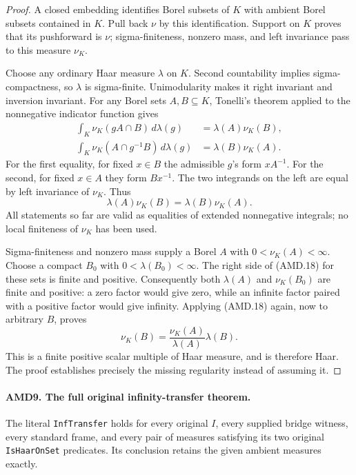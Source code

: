 \begin{proof}
A closed embedding identifies Borel subsets of \(K\) with
ambient Borel subsets contained in \(K\).  Pull back \(\nu\)
by this identification.  Support on \(K\) proves that its
pushforward is \(\nu\); sigma-finiteness, nonzero mass, and
left invariance pass to this measure \(\nu_K\).

Choose any ordinary Haar measure \(\lambda\) on \(K\).
Second countability implies sigma-compactness, so \(\lambda\)
is sigma-finite.  Unimodularity makes it right invariant and
inversion invariant.  For any Borel sets \(A,B\subseteq K\),
Tonelli's theorem applied to the nonnegative indicator function
gives
\[
\begin{split}
 \int_K\nu_K(gA\cap B)\,d\lambda(g)
        &=\lambda(A)\nu_K(B),\\
 \int_K\nu_K(A\cap g^{-1}B)\,d\lambda(g)
        &=\lambda(B)\nu_K(A).
\end{split}
 \tag{AMD.17}
\]
For the first equality, for fixed \(x\in B\) the admissible
\(g\)'s form \(xA^{-1}\).  For the second, for fixed
\(x\in A\) they form \(Bx^{-1}\).  The two integrands on
the left are equal by left invariance of \(\nu_K\).  Thus
\[
                \lambda(A)\nu_K(B)
                     =\lambda(B)\nu_K(A).
 \tag{AMD.18}
\]
All statements so far are valid as equalities of extended
nonnegative integrals; no local finiteness of \(\nu_K\)
has been used.

Sigma-finiteness and nonzero mass supply a Borel \(A\) with
\(0<\nu_K(A)<\infty\).  Choose a compact \(B_0\) with
\(0<\lambda(B_0)<\infty\).  The right side of (AMD.18) for
these sets is finite and positive.  Consequently both
\(\lambda(A)\) and \(\nu_K(B_0)\) are finite and positive:
a zero factor would give zero, while an infinite factor paired
with a positive factor would give infinity.  Applying (AMD.18)
again, now to arbitrary \(B\), proves
\[
             \nu_K(B)=
                \frac{\nu_K(A)}{\lambda(A)}\lambda(B).
 \tag{AMD.19}
\]
This is a finite positive scalar multiple of Haar measure, and
is therefore Haar.  The proof establishes precisely the missing
regularity instead of assuming it.
\end{proof}

\paragraph{AMD9. The full original infinity-transfer theorem.}
\label{claim:AMD9}
The literal \texttt{InfTransfer} holds for every original
\(I\), every supplied bridge witness, every standard frame,
and every pair of measures satisfying its two original
\texttt{IsHaarOnSet} predicates.  Its conclusion retains the
given ambient measures exactly.

